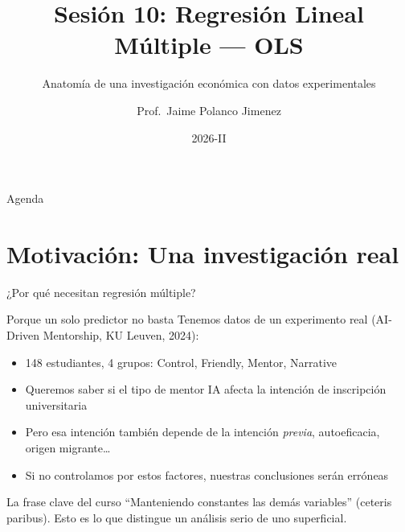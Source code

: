 \documentclass[aspectratio=169, 11pt]{beamer}
\title{Sesión 10: Regresión Lineal Múltiple --- OLS}
\subtitle{Anatomía de una investigación económica con datos experimentales}
\author{Prof.\ Jaime Polanco Jimenez}
\date{2026-II}
\begin{document}
\begin{frame}
\titlepage
\end{frame}

\begin{frame}{Agenda}
\small
\tableofcontents
\end{frame}

\section{Motivación: Una investigación real}

\begin{frame}{¿Por qué necesitan regresión múltiple?}
\begin{exampleblock}{Porque un solo predictor no basta}
\small
Tenemos datos de un experimento real (AI-Driven Mentorship, KU Leuven, 2024):
\begin{itemize}\setlength{\itemsep}{2pt}
  \item 148 estudiantes, 4 grupos: Control, Friendly, Mentor, Narrative
  \item Queremos saber si el tipo de mentor IA afecta la intención de inscripción universitaria
  \item Pero esa intención también depende de la intención \textit{previa}, autoeficacia, origen migrante\ldots
  \item Si no controlamos por estos factores, nuestras conclusiones serán erróneas
\end{itemize}
\end{exampleblock}

\begin{block}{La frase clave del curso}
\small
``Manteniendo constantes las demás variables'' (ceteris paribus). Esto es lo que distingue un análisis serio de uno superficial.
\end{block}
\end{frame}
\end{document}
